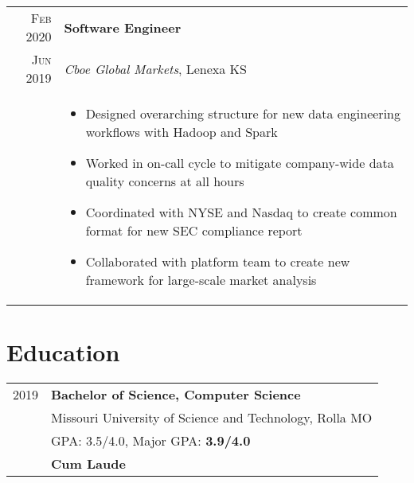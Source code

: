 \documentclass[a4paper,10pt]{article}
\begin{document}
\begin{tabular}{r|p{15cm}}
  \textsc{Feb 2020}  & \textbf{Software Engineer} \\
  \textsc{Jun 2019}  & \textit{Cboe Global Markets}, Lenexa KS
  \\ &
       \begin{itemize}
       \item Designed overarching structure for new data engineering workflows with Hadoop and Spark
       \item Worked in on-call cycle to mitigate company-wide data quality concerns at all hours
       \item Coordinated with NYSE and Nasdaq to create common format for new SEC compliance report
       \item Collaborated with platform team to create new framework for large-scale market analysis
       \end{itemize} \\
\end{tabular}


\section{Education}
\begin{tabular}{r p{15cm}}
  \textsc{2019} & \textbf{Bachelor of Science, Computer Science} \\
                & Missouri University of Science and Technology, Rolla MO  \\
                & GPA: 3.5/4.0, Major GPA: \textbf{3.9/4.0} \\
                & \textbf{Cum Laude} \\
\end{tabular}
\end{document}
